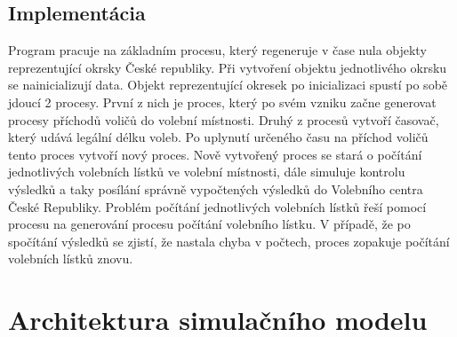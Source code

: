 \documentclass[12pt,a4paper,titlepage,final]{article}
\begin{document}
\subsection{Implementácia}
Program pracuje na základním procesu, který regeneruje v čase nula objekty reprezentující okrsky České republiky. Při vytvoření objektu jednotlivého okrsku se nainicializují data. Objekt reprezentující okresek po inicializaci spustí po sobě jdoucí 2 procesy. První z nich je proces, který po svém vzniku začne generovat procesy příchodů voličů do volební místnosti. Druhý z procesů vytvoří časovač, který udává legální délku voleb. Po uplynutí určeného času na příchod voličů tento proces vytvoří nový proces. Nově vytvořený proces se stará o počítání jednotlivých volebních lístků ve volební místnosti, dále simuluje kontrolu výsledků a taky posílání správně vypočtených výsledků do Volebního centra České Republiky. Problém počítání jednotlivých volebních lístků řeší pomocí procesu na generování procesu počítání volebního lístku. V případě, že po spočítání výsledků se zjistí, že nastala chyba v počtech, proces zopakuje počítání volebních lístků znovu. 




\section{Architektura simulačního modelu}
\end{document}
